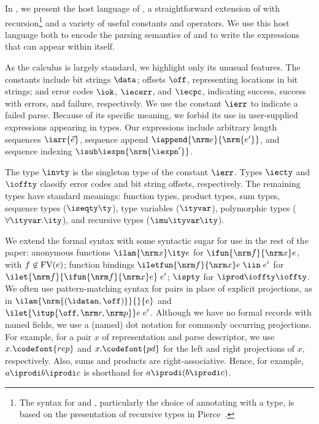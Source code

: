 In , we present the host language of
\ddc{}, a straightforward extension of \fomega{} with
recursion\footnote{The syntax for  and ,
  particularly the choice of annotating  with a type, is
  based on the presentation of recursive types in Pierce~\cite{pierce:tapl}.} and a
variety of useful constants and operators. 
We use this host language both to encode the parsing semantics of
\ddc{} and to write the expressions that can appear within \ddc{}
itself.

As the calculus is largely standard, we highlight only its unusual
features. The constants include bit strings $\data$; offsets $\off$,
representing locations in bit strings; and error codes $\iok$,
$\iecerr$, and $\iecpc$, indicating success, success with errors, and
failure, respectively. We use the constant $\ierr$ to indicate a
failed parse.  Because of its specific meaning, we forbid its use in
user-supplied expressions appearing in \ddc{} types.
Our expressions include arbitrary length
sequences $\iarr{\vec e}$, sequence append $\iappend {\nrm e}
{\nrm {e'}}$, and sequence indexing $\isub \iexpn {\nrm {\iexpn'}}$.

The type $\invty$ is the singleton type of the constant $\ierr$.
Types $\iecty$ and $\ioffty$ classify error codes and bit string
offsets, respectively. The remaining types have standard meanings:
function types, product types, sum types, sequence types ($\iseqty
\ty$), type variables ($\ityvar$), polymorphic types ($\forall
\ityvar.\ity$), and recursive types ($\imu \ityvar \ity$).

We extend the formal syntax with some syntactic sugar for use in the
rest of the paper: anonymous functions $\ilam {\nrm x} \ity e$ for
$\ifun {\nrm f} {\nrm x} e$, with $f \not\in {\rm FV}(e)$; function
bindings $\iletfun {\nrm f} {\nrm x} e \; \iin \; e'$ for $\ilet {\nrm
  f} {\ifun {\nrm f} {\nrm x} e} \; e'$; $\ispty$ for $\iprod \ioffty
\ioffty$.  
We often use pattern-matching syntax for pairs in place of
explicit projections, as in $\ilam {\nrm{(\idatan,\off)}}{}{e}$ and $\ilet
{\itup{\off,\nrm r,\nrm p}} e\; e'$.  Although we have no formal records with
named fields, we use a (named) dot notation for commonly occurring projections.
For example, for a pair $x$ of representation and parse descriptor, we use
$x.\codefont{rep}$ and $x.\codefont{pd}$ for the left and right
projections of $x$, respectively. Also, sums and products are
right-associative. Hence, for example, $a \iprodi b \iprodi c$ is
shorthand for $a \iprodi (b \iprodi c)$.

